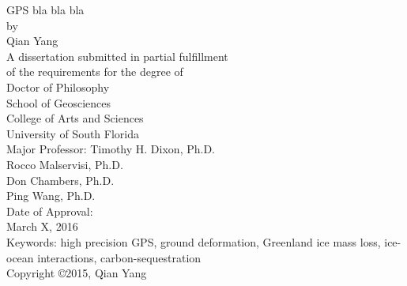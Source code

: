 \begin{titlepage}
\begin{center}
\singlespacing
{ \vspace*{\baselineskip} }
{ \vspace*{\baselineskip} }
{ \vspace*{\baselineskip} }
{ \vspace*{\baselineskip} }
GPS bla bla bla\\
{ \vspace*{\baselineskip} }
{ \vspace*{\baselineskip} }
{ \vspace*{\baselineskip} }
by\\
{ \vspace*{\baselineskip} }
{ \vspace*{\baselineskip} }
{ \vspace*{\baselineskip} }
Qian Yang\\
{ \vspace*{\baselineskip} }
{ \vspace*{\baselineskip} }
{ \vspace*{\baselineskip} }
{ \vspace*{\baselineskip} }
A dissertation submitted in partial fulfillment\\
of the requirements for the degree of\\
Doctor of Philosophy\\
School of Geosciences\\
College of Arts and Sciences\\
University of South Florida\\
{ \vspace*{\baselineskip} }
{ \vspace*{\baselineskip} }
{ \vspace*{\baselineskip} }
Major Professor: Timothy H. Dixon, Ph.D.\\
Rocco Malservisi, Ph.D.\\
Don Chambers, Ph.D.\\
Ping Wang, Ph.D.\\
{ \vspace*{\baselineskip} }
{ \vspace*{\baselineskip} }
Date of Approval:\\
March X, 2016\\
{ \vspace*{\baselineskip} }
{ \vspace*{\baselineskip} }
{ \vspace*{\baselineskip} }
Keywords: high precision GPS, ground deformation, Greenland ice mass loss, ice-ocean interactions, carbon-sequestration\\
{ \vspace*{\baselineskip} }
Copyright \copyright\hspace{1mm}2015, Qian Yang\\
\end{center}
\end{titlepage}